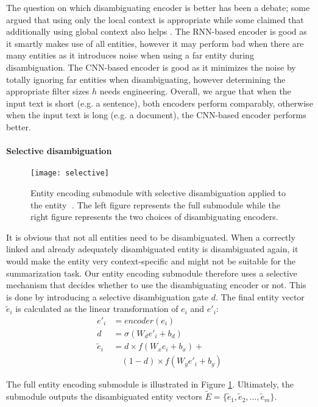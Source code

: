 \documentclass[11pt,a4paper]{article}
\begin{document}
The question on which disambiguating encoder is better has been a debate; some argued that using only the local context is appropriate \cite{lau2013unimelb} while some claimed that additionally using global context also helps \cite{wang2015sense}.
The RNN-based encoder is good as it smartly makes use of all entities, however it may perform bad when there are many entities as it introduces noise when using a far entity during disambiguation. The CNN-based encoder is good as it minimizes the noise by totally ignoring far entities when disambiguating, however determining the appropriate filter sizes $h$ needs engineering. Overall, we argue that when the input text is short (e.g. a sentence), both encoders perform comparably, otherwise when the input text is long (e.g. a document), the CNN-based encoder performs better.

\paragraph{Selective disambiguation}

\begin{figure}[t]
    \centering
    \texttt{[image: selective]}
    \caption{Entity encoding submodule with selective disambiguation applied to the entity \textcircled{\raisebox{-0.9pt}{3}}. 
    The left figure represents the full submodule while the right figure represents the two choices of disambiguating encoders.
}
    \label{fig:sd}
\end{figure}

It is obvious that not all entities need to be disambiguated. When a correctly linked and already adequately disambiguated entity is disambiguated again, it would make the entity very context-specific and might not be suitable for the summarization task. Our entity encoding submodule therefore uses a selective mechanism that decides whether to use the disambiguating encoder or not. This is done by introducing a selective disambiguation gate $d$. The final entity vector $\tilde{e}_i$ is calculated as the linear transformation of $e_i$ and $e'_i$:
\begin{align*}
    e'_i &= encoder(e_i) \\
    d &= \sigma(W_d e'_i + b_d) \\
    \tilde{e}_i &= d \times f(W_x e_i + b_x) + \\ & \quad (1-d) \times f(W_y e'_i + b_y) \nonumber
\end{align*}

The full entity encoding submodule is illustrated in Figure \ref{fig:sd}. Ultimately, the submodule outputs the disambiguated entity vectors $\tilde{E} = \{\tilde{e}_1, \tilde{e}_2, ..., \tilde{e}_m\}$.
\end{document}
